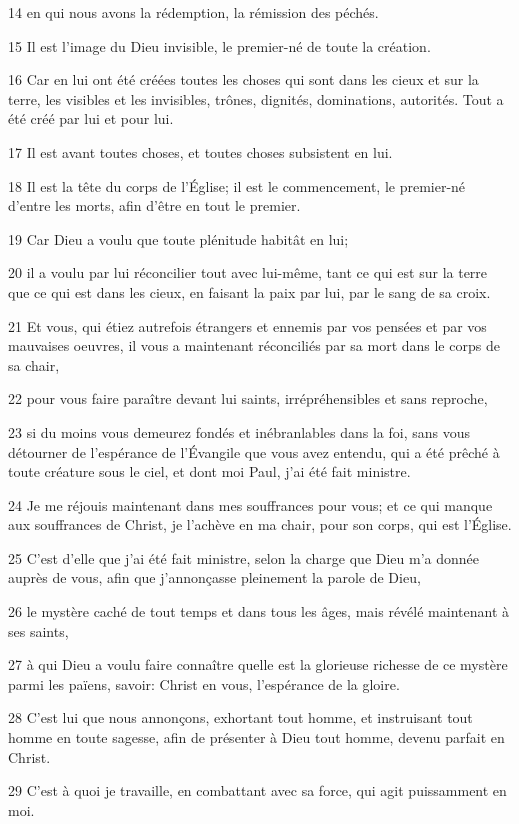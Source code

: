 \par 14 en qui nous avons la rédemption, la rémission des péchés.
\par 15 Il est l'image du Dieu invisible, le premier-né de toute la création.
\par 16 Car en lui ont été créées toutes les choses qui sont dans les cieux et sur la terre, les visibles et les invisibles, trônes, dignités, dominations, autorités. Tout a été créé par lui et pour lui.
\par 17 Il est avant toutes choses, et toutes choses subsistent en lui.
\par 18 Il est la tête du corps de l'Église; il est le commencement, le premier-né d'entre les morts, afin d'être en tout le premier.
\par 19 Car Dieu a voulu que toute plénitude habitât en lui;
\par 20 il a voulu par lui réconcilier tout avec lui-même, tant ce qui est sur la terre que ce qui est dans les cieux, en faisant la paix par lui, par le sang de sa croix.
\par 21 Et vous, qui étiez autrefois étrangers et ennemis par vos pensées et par vos mauvaises oeuvres, il vous a maintenant réconciliés par sa mort dans le corps de sa chair,
\par 22 pour vous faire paraître devant lui saints, irrépréhensibles et sans reproche,
\par 23 si du moins vous demeurez fondés et inébranlables dans la foi, sans vous détourner de l'espérance de l'Évangile que vous avez entendu, qui a été prêché à toute créature sous le ciel, et dont moi Paul, j'ai été fait ministre.
\par 24 Je me réjouis maintenant dans mes souffrances pour vous; et ce qui manque aux souffrances de Christ, je l'achève en ma chair, pour son corps, qui est l'Église.
\par 25 C'est d'elle que j'ai été fait ministre, selon la charge que Dieu m'a donnée auprès de vous, afin que j'annonçasse pleinement la parole de Dieu,
\par 26 le mystère caché de tout temps et dans tous les âges, mais révélé maintenant à ses saints,
\par 27 à qui Dieu a voulu faire connaître quelle est la glorieuse richesse de ce mystère parmi les païens, savoir: Christ en vous, l'espérance de la gloire.
\par 28 C'est lui que nous annonçons, exhortant tout homme, et instruisant tout homme en toute sagesse, afin de présenter à Dieu tout homme, devenu parfait en Christ.
\par 29 C'est à quoi je travaille, en combattant avec sa force, qui agit puissamment en moi.


